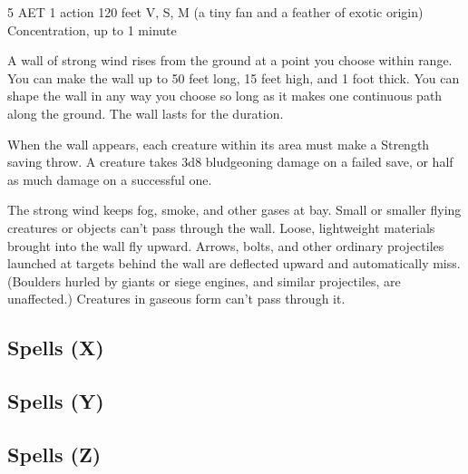 {5 AET}
{1 action}
{120 feet}
{V, S, M (a tiny fan and a feather of exotic origin)}
{Concentration, up to 1 minute}

A wall of strong wind rises from the ground at a point you choose within range. You can make the wall up to 50 feet long, 15 feet high, and 1 foot thick. You can shape the wall in any way you choose so long as it makes one continuous path along the ground. The wall lasts for the duration.

When the wall appears, each creature within its area must make a Strength saving throw. A creature takes 3d8 bludgeoning damage on a failed save, or half as much damage on a successful one.

The strong wind keeps fog, smoke, and other gases at bay. Small or smaller flying creatures or objects can't pass through the wall. Loose, lightweight materials brought into the wall fly upward. Arrows, bolts, and other ordinary projectiles launched at targets behind the wall are deflected upward and automatically miss. (Boulders hurled by giants or siege engines, and similar projectiles, are unaffected.) Creatures in gaseous form can't pass through it.

\subsection{Spells (X)}

\subsection{Spells (Y)}

\subsection{Spells (Z)}
